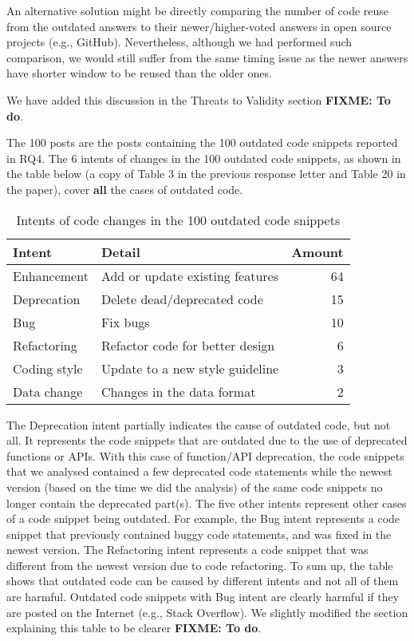 \documentclass[a4paper,twoside,10pt]{reviewresponse}
\newcommand\FIXME[1]{{\color{red}\textbf{FIXME: #1}}}
\begin{document}
An alternative solution might be directly comparing the number of code reuse from the outdated answers to their newer/higher-voted answers in open source projects (e.g., GitHub). 
Nevertheless, although we had performed such comparison, we would still suffer from the same timing issue as the newer answers have shorter window to be reused than the older ones.

We have added this discussion in the Threats to Validity section \FIXME{To do}.


The 100 posts are the posts containing the 100 outdated code snippets reported in RQ4. The 6 intents of changes in the 100 outdated code snippets, as shown in the table below (a copy of Table 3 in the previous response letter and Table 20 in the paper), cover \textbf{all} the cases of outdated code. 

\begin{table}[H]
	\centering
	\begin{tabular}{llr}
		\toprule
		Intent & Detail & Amount \\
		\midrule
		Enhancement & Add or update existing features & 64 \\
		Deprecation & Delete dead/deprecated code & 15 \\
		Bug & Fix bugs & 10 \\
		Refactoring & Refactor code for better design & 6 \\
		Coding style & Update to a new style guideline & 3 \\
		Data change & Changes in the data format & 2 \\
		\bottomrule
	\end{tabular}
	\label{tab:intent_outdated}
	\caption{Intents of code changes in the 100 outdated code snippets}
\end{table}

The Deprecation intent partially indicates the cause of outdated code, but not all. It represents the code snippets that are outdated due to the use of deprecated functions or APIs. With this case of function/API deprecation, the code snippets that we analysed contained a few deprecated code statements while the newest version (based on the time we did the analysis) of the same code snippets no longer contain the deprecated part(s). The five other intents represent other cases of a code snippet being outdated. For example, the Bug intent represents a code snippet that previously contained buggy code statements, and was fixed in the newest version. The Refactoring intent represents a code snippet that was different from the newest version due to code refactoring.
To sum up, the table shows that outdated code can be caused by different intents and not all of them are harmful. Outdated code snippets with Bug intent are clearly harmful if they are posted on the Internet (e.g., Stack Overflow). We slightly modified the section explaining this table to be clearer \FIXME{To do}.
\end{document}
